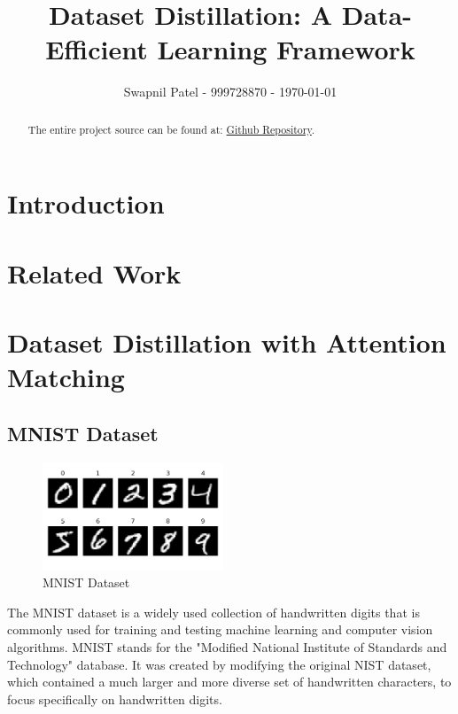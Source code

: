 \documentclass[conference, compsoc]{IEEEtran}
\begin{document}
\title{Dataset Distillation: A Data-Efficient Learning Framework}
\author{Swapnil Patel - 999728870 - \today}

\author{
	}

\maketitle

\begin{abstract}
\label{sec:abstract}
The entire project source can be found at: \href{https://github.com/Swapnil949/ECE1512_2024F_ProjectRepo_SwapnilPatel}{Github Repository}.

\end{abstract}

\section{Introduction}
\label{sec:intro}



\section{Related Work}
\label{sec:related}

\section{Dataset Distillation with Attention Matching}

\subsection{MNIST Dataset}
\begin{figure}[H]
	\centering
	\includegraphics[width=0.48\textwidth]{MNIST_dataset.png}
	\caption{MNIST Dataset \cite{deng2012mnist}}
	\label{fig:mnist_dataset}
\end{figure}
The MNIST dataset is a widely used collection of handwritten digits that is commonly used for training and testing machine learning and computer vision algorithms. MNIST stands for the "Modified National Institute of Standards and Technology" database. It was created by modifying the original NIST dataset, which contained a much larger and more diverse set of handwritten characters, to focus specifically on handwritten digits.
\end{document}
